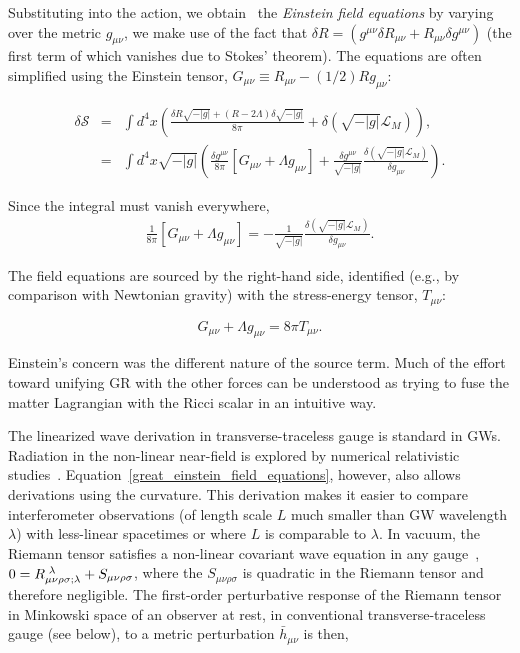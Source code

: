 Substituting into the action, we obtain~\cite{Carroll1997} the \textit{Einstein field equations} by varying over the metric $g_{\mu\nu}$, we make use of the fact that $\delta R = (g^{\mu\nu} \delta R_{\mu\nu} + R_{\mu\nu} \delta g^{\mu\nu})$ (the first term of which vanishes due to Stokes' theorem).
The equations are often simplified using the Einstein tensor, $G_{\mu\nu} \equiv R_{\mu\nu} - (1/2)R g_{\mu\nu}$:

\begin{eqnarray}
\delta \mathcal{S} &=& \int d^4 x \left( \frac{\delta R \sqrt{-|g|} + (R-2\Lambda)\delta \sqrt{-|g|}}{8\pi}+ \delta (\sqrt{-|g|}\mathcal{L}_M)\right), \\
 &=& \int d^4 x \sqrt{-|g|}\left( \frac{\delta g^{\mu\nu}}{8\pi} \left[ G_{\mu\nu} + \Lambda g_{\mu\nu} \right]
 + \frac{\delta g^{\mu \nu}}{\sqrt{-|g|}} \frac{\delta (\sqrt{-|g|}\mathcal{L}_M)}{\delta g_{\mu\nu}} \right).
\end{eqnarray}

\noindent Since the integral must vanish everywhere,
\begin{eqnarray}
\frac{1}{8\pi} \left[G_{\mu\nu} + \Lambda g_{\mu\nu} \right] = -\frac{1}{\sqrt{-|g|}}\frac{\delta (\sqrt{-|g|}\mathcal{L}_M)}{\delta g_{\mu\nu}}.
\end{eqnarray}

\noindent The field equations are sourced by the right-hand side, identified (e.g., by comparison with Newtonian gravity) with the stress-energy tensor, $T_{\mu\nu}$:

\begin{equation}
G_{\mu\nu} + \Lambda g_{\mu\nu} = 8 \pi T_{\mu\nu}.
\label{great_einstein_field_equations}
\end{equation}

Einstein's concern was the different nature of the source term.
Much of the effort toward unifying GR with the other forces can be understood as trying to fuse the matter Lagrangian with the Ricci scalar in an intuitive way.

The linearized wave derivation in transverse-traceless gauge is standard in GWs. 
Radiation in the non-linear near-field is explored by numerical relativistic studies~\cite{FarrThesis}.
Equation~\ref{great_einstein_field_equations}, however, also allows derivations using the curvature.
This derivation makes it easier to compare interferometer observations (of length scale $L$ much smaller than GW wavelength $\lambda$) with less-linear spacetimes or where $L$ is comparable to $\lambda$.
In vacuum, the Riemann tensor satisfies a non-linear covariant wave equation in any gauge~\cite{KoopFinn2014}, $0 = R_{\mu \nu \rho \sigma; \lambda}^{\textup{        } \lambda} + S_{\mu \nu \rho \sigma}$, where the $S_{\mu \nu \rho \sigma}$ is quadratic in the Riemann tensor and therefore negligible.
The first-order perturbative response of the Riemann tensor in Minkowski space of an observer at rest, in conventional transverse-traceless gauge (see below), to a metric perturbation $\bar{h}_{\mu\nu}$ is then,

